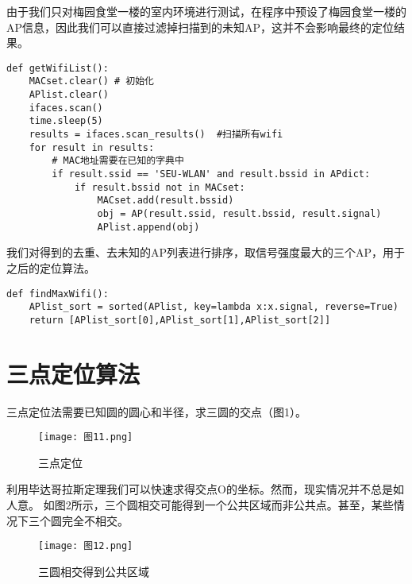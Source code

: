 \documentclass{article}
\begin{document}
由于我们只对梅园食堂一楼的室内环境进行测试，在程序中预设了梅园食堂一楼的AP信息，因此我们可以直接过滤掉扫描到的未知AP，这并不会影响最终的定位结果。

\begin{verbatim}
def getWifiList():
    MACset.clear() # 初始化
    APlist.clear()
    ifaces.scan()
    time.sleep(5)
    results = ifaces.scan_results()  #扫描所有wifi
    for result in results:
        # MAC地址需要在已知的字典中
        if result.ssid == 'SEU-WLAN' and result.bssid in APdict:
            if result.bssid not in MACset:
                MACset.add(result.bssid)
                obj = AP(result.ssid, result.bssid, result.signal)
                APlist.append(obj) 
\end{verbatim}

我们对得到的去重、去未知的AP列表进行排序，取信号强度最大的三个AP，用于之后的定位算法。

\begin{verbatim}
def findMaxWifi(): 
    APlist_sort = sorted(APlist, key=lambda x:x.signal, reverse=True)
    return [APlist_sort[0],APlist_sort[1],APlist_sort[2]]
\end{verbatim}

\section{三点定位算法}

三点定位法需要已知圆的圆心和半径，求三圆的交点（图1）。

\begin{figure}[ht] %

    \centering

    \texttt{[image: 图11.png]}

    \caption{三点定位}

    \label{fig:j}

\end{figure}

利用毕达哥拉斯定理我们可以快速求得交点O的坐标。然而，现实情况并不总是如人意。
如图2所示，三个圆相交可能得到一个公共区域而非公共点。甚至，某些情况下三个圆完全不相交。

\begin{figure}[ht] %

    \centering

    \texttt{[image: 图12.png]}

    \caption{三圆相交得到公共区域}

    \label{fig:k}

\end{figure}
\end{document}

